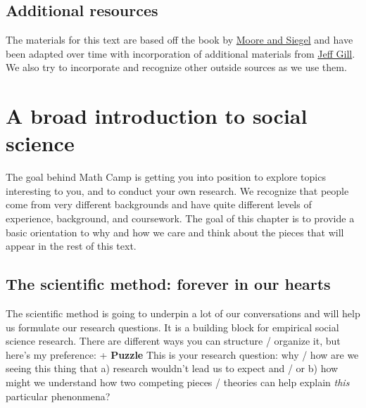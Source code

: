 \documentclass[
]{book}
\begin{document}
\hypertarget{additional-resources}{%
\section{Additional resources}\label{additional-resources}}

The materials for this text are based off the book by \href{https://press.princeton.edu/books/paperback/9780691159171/a-mathematics-course-for-political-and-social-research}{Moore and Siegel} and have been adapted over time with incorporation of additional materials from \href{https://jeffgill.org/2021/04/12/essential-mathematics-for-political-and-social-research/}{Jeff Gill}. We also try to incorporate and recognize other outside sources as we use them.

\hypertarget{a-broad-introduction-to-social-science}{%
\chapter{A broad introduction to social science}\label{a-broad-introduction-to-social-science}}

The goal behind Math Camp is getting you into position to explore topics interesting to you, and to conduct your own research. We recognize that people come from very different backgrounds and have quite different levels of experience, background, and coursework. The goal of this chapter is to provide a basic orientation to why and how we care and think about the pieces that will appear in the rest of this text.

\hypertarget{the-scientific-method-forever-in-our-hearts}{%
\section{The scientific method: forever in our hearts}\label{the-scientific-method-forever-in-our-hearts}}

The scientific method is going to underpin a lot of our conversations and will help us formulate our research questions. It is a building block for empirical social science research. There are different ways you can structure / organize it, but here's my preference:
+ \textbf{Puzzle} This is your research question: why / how are we seeing this thing that a) research wouldn't lead us to expect and / or b) how might we understand how two competing pieces / theories can help explain \emph{this} particular phenonmena?
\end{document}
